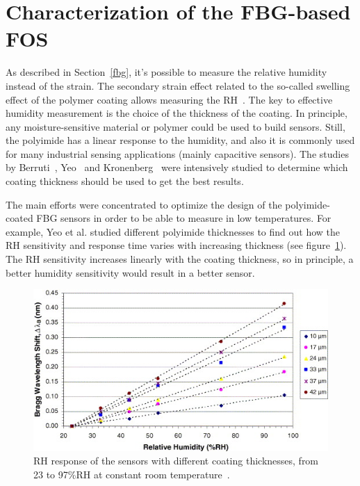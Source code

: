 \section{Characterization of the FBG-based FOS}

As described in Section~\ref{fbg}, it's possible to measure the relative humidity instead of the strain. The secondary strain effect related to the so-called swelling effect of the polymer coating allows measuring the \gls{RH}~\cite{YEO_PI}. The key to effective humidity measurement is the choice of the thickness of the coating. In principle, any moisture-sensitive material or polymer could be used to build sensors. Still, the polyimide has a linear response to the humidity, and also it is commonly used for many industrial sensing applications (mainly capacitive sensors). The studies by Berruti~\cite{Berruti}, Yeo~\cite{YEO_PI} and Kronenberg~\cite{Kronenberg:02} were intensively studied to determine which coating thickness should be used to get the best results. 

The main efforts were concentrated to optimize the design of the polyimide-coated FBG sensors in order to be able to measure in low temperatures. For example, Yeo et al. \cite{YEO_PI} studied different polyimide thicknesses to find out how the \gls{RH} sensitivity and response time varies with increasing thickness (see figure~\ref{fig:yeo}). The \gls{RH} sensitivity increases linearly with the coating thickness, so in principle, a better humidity sensitivity would result in a better sensor.

\begin{figure}[!h]
\centering
\includegraphics[width=0.80\columnwidth]{Chapter5/images/yeo_coating.jpg}
\caption{RH response of the sensors with different coating thicknesses, from 23 to 97\%RH at constant room temperature~\cite{YEO_PI}.}
\label{fig:yeo}
\end{figure}

